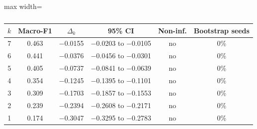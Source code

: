 \begin{table}[t]
\centering
\small
\caption{}
\label{tab:bipolar}
\setlength{\tabcolsep}{4pt}
\begin{adjustbox}{max width=\textwidth}
\begin{tabular}{rccccc}
\toprule
$k$ & Macro-F1 & $\Delta_k$ & 95\% CI & Non-inf. & Bootstrap seeds \\
\midrule
7 & 0.463 & $-$0.0155 & $-$0.0203 to $-$0.0105 & no & 0\% \\
6 & 0.441 & $-$0.0376 & $-$0.0456 to $-$0.0301 & no & 0\% \\
5 & 0.405 & $-$0.0737 & $-$0.0841 to $-$0.0639 & no & 0\% \\
4 & 0.354 & $-$0.1245 & $-$0.1395 to $-$0.1101 & no & 0\% \\
3 & 0.309 & $-$0.1703 & $-$0.1857 to $-$0.1553 & no & 0\% \\
2 & 0.239 & $-$0.2394 & $-$0.2608 to $-$0.2171 & no & 0\% \\
1 & 0.174 & $-$0.3047 & $-$0.3295 to $-$0.2783 & no & 0\% \\
\bottomrule
\end{tabular}
\end{adjustbox}
\end{table}
